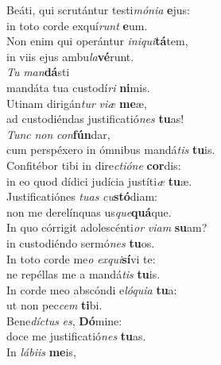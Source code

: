 \evenverse Beáti, qui scrutántur testi\textit{mó}\textit{ni}\textit{a} \textbf{e}jus:~\*\\
\evenverse in toto corde exquí\textit{runt} \textbf{e}um.\\
\oddverse Non enim qui operántur \textit{i}\textit{ni}\textit{qui}\textbf{tá}tem,~\*\\
\oddverse in viis ejus ambu\textit{la}\textbf{vé}runt.\\
\evenverse \textit{Tu} \textit{man}\textbf{dá}sti~\*\\
\evenverse mandáta tua custodí\textit{ri} \textbf{ni}mis.\\
\oddverse Utinam dirigán\textit{tur} \textit{vi}\textit{æ} \textbf{me}æ,~\*\\
\oddverse ad custodiéndas justificatió\textit{nes} \textbf{tu}as!\\
\evenverse \textit{Tunc} \textit{non} \textit{con}\textbf{fún}dar,~\*\\
\evenverse cum perspéxero in ómnibus mandá\textit{tis} \textbf{tu}is.\\
\oddverse Confitébor tibi in dire\textit{cti}\textit{ó}\textit{ne} \textbf{cor}dis:~\*\\
\oddverse in eo quod dídici judícia justíti\textit{æ} \textbf{tu}æ.\\
\evenverse Justificatiónes \textit{tu}\textit{as} \textit{cu}\textbf{stó}diam:~\*\\
\evenverse non me derelínquas us\textit{que}\textbf{quá}que.\\
\oddverse In quo córrigit adolescénti\textit{or} \textit{vi}\textit{am} \textbf{su}am?~\*\\
\oddverse in custodiéndo sermó\textit{nes} \textbf{tu}os.\\
\evenverse In toto corde me\textit{o} \textit{ex}\textit{qui}\textbf{sí}vi te:~\*\\
\evenverse ne repéllas me a mandá\textit{tis} \textbf{tu}is.\\
\oddverse In corde meo abscóndi e\textit{ló}\textit{qui}\textit{a} \textbf{tu}a:~\*\\
\oddverse ut non pec\textit{cem} \textbf{ti}bi.\\
\evenverse Bene\textit{dí}\textit{ctus} \textit{es}, \textbf{Dó}mine:~\*\\
\evenverse doce me justificatió\textit{nes} \textbf{tu}as.\\
\oddverse In \textit{lá}\textit{bi}\textit{is} \textbf{me}is,~\*\\
